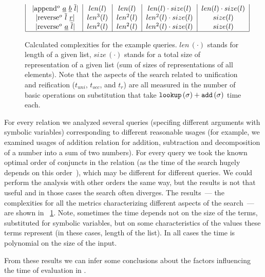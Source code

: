 \begin{figure}[t]
\[\begin{tabular}{|c|c|c|c|c|}
           \lstinline|append$^o$ $\underline{a}$ $\underline{b}$ $\overline{l}$| & $len(l)$ & $len(l)$ & $len(l) \cdot size(l)$ & $len(l) \cdot size(l)$  \\
           \lstinline|reverse$^o$ $\overline{l}$ $\underline{r}$| & $len^3(l)$ & $len^2(l)$ & $len^2(l) \cdot size(l)$ & $size(l)$  \\
           \lstinline|reverse$^o$ $\underline{a}$ $\overline{l}$| & $len^2(l)$ & $len^2(l)$ & $len^2(l) \cdot size(l)$ & $size(l)$  \\
           \hline
      \end{tabular} \]
      \caption{Calculated complexities for the example queries. $len\,(\cdot)$ stands for length of a given list, $size\,(\cdot)$ stands for a total size of representation of a given
        list (sum of sizes of representations of all elements). Note that the aspects of the search related to unification and reification ($t_{uni}$, $t_{occ}$, and $t_r$) are all measured
        in the number of basic operations on substitution that take $\texttt{lookup}\,(\sigma) + \texttt{add}\,(\sigma)$ time each.}
  \label{fig:examples_all_complexities}
\end{figure}

For every relation we analyzed several queries (specifing different arguments with symbolic variables) corresponding to different reasonable usages (for example, we examined usages
of addition relation for addition, subtraction and decomposition of a number into a sum of two numbers). For every query we took the known optimal order of conjuncts in the relation
(as the time of the search hugely depends on this order~\cite{WillThesis}), which may be different for different queries. We could perform the analysis with other orders the same way,
but the results is not that useful and in those cases the search often diverges. The results~--- the complexities for all the metrics characterizing different aspects of the search~---
are shown in \figureword~\ref{fig:examples_all_complexities}. Note, sometimes the time depends not on the size of the terms, substituted for symbolic variables, but on some
characteristics of the values these terms represent (in these cases, length of the list). In all cases the time is polynomial on the size of the input.

From these results we can infer some conclusions about the factors influencing the time of evaluation in \mK.

